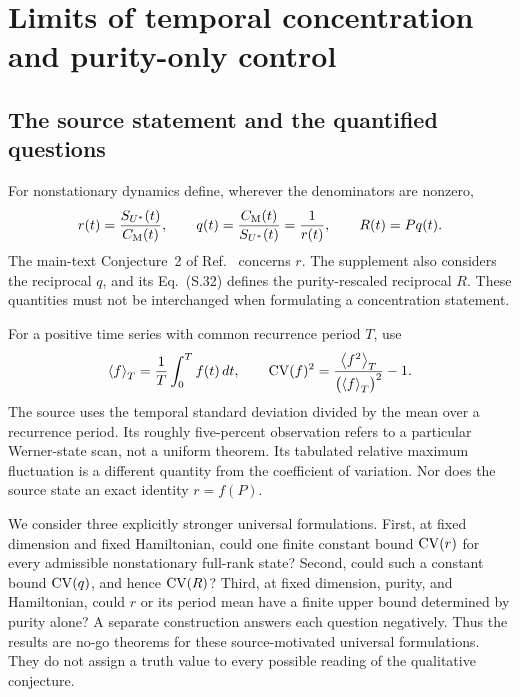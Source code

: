 \section{Limits of temporal concentration and purity-only control}\label{sec:ratios}
\subsection{The source statement and the quantified questions}
For nonstationary dynamics define, wherever the denominators are nonzero,
\begin{equation}\label{eq:ratios}
 r(t)=\frac{S_{U^*}(t)}{C_{\mathrm M}(t)},\qquad
 q(t)=\frac{C_{\mathrm M}(t)}{S_{U^*}(t)}=\frac1{r(t)},\qquad R(t)=Pq(t).
\end{equation}
The main-text Conjecture~2 of Ref.~\cite{DasMori2026} concerns $r$.
The supplement also considers the reciprocal $q$, and its Eq.~(S.32)
defines the purity-rescaled reciprocal $R$. These quantities must not be
interchanged when formulating a concentration statement.

For a positive time series with common recurrence period $T$, use
\begin{equation}\label{eq:cv-definition}
 \left\langle f\right\rangle_T=\frac1T\int_0^T f(t)\,dt,\qquad
 \operatorname{CV}(f)^2=\frac{\left\langle f^2\right\rangle_T}{\bigl(\left\langle f\right\rangle_T\bigr)^2}-1.
\end{equation}
The source uses the temporal standard deviation divided by the mean over
a recurrence period. Its roughly five-percent observation refers to a
particular Werner-state scan, not a uniform theorem. Its tabulated relative
maximum fluctuation is a different quantity from the coefficient of
variation. Nor does the source state an exact identity $r=f(P)$.

We consider three explicitly stronger universal formulations. First, at
fixed dimension and fixed Hamiltonian, could one finite constant bound
$\operatorname{CV}(r)$ for every admissible nonstationary full-rank state? Second, could
such a constant bound $\operatorname{CV}(q)$, and hence $\operatorname{CV}(R)$? Third, at fixed
dimension, purity, and Hamiltonian, could $r$ or its period mean have a
finite upper bound determined by purity alone? A separate construction
answers each question negatively. Thus the results are no-go theorems for
these source-motivated universal formulations. They do not assign a truth
value to every possible reading of the qualitative conjecture.

